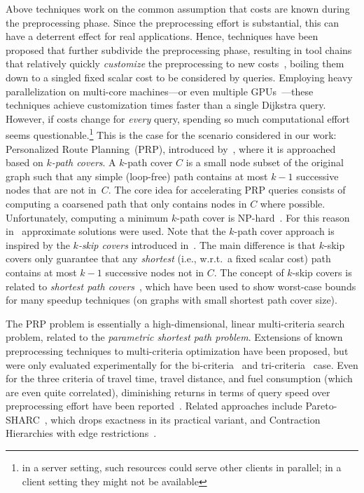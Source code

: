 \documentclass{sig-alternate}
\begin{document}
Above techniques work on the common assumption that costs
are known during the preprocessing phase. Since the preprocessing
effort is substantial, this can have a deterrent effect for real applications. 
Hence, techniques have been proposed that further subdivide the preprocessing phase, resulting in tool chains
that relatively quickly \emph{customize} the preprocessing to new costs~\cite{dgpw-crprn-13,dsw-cch-sea-14}, 
boiling them down to a singled fixed scalar cost to be considered by queries. 
Employing heavy parallelization on multi-core machines---or even multiple GPUs~\cite{dkw-cddgp-14}---these techniques achieve customization times faster than a single Dijkstra query. However, if costs change for \emph{every} query, spending so much computational effort seems questionable.\footnote{in a server setting, such resources could serve other clients in parallel; in a client setting they might not be available}
This is the case
for the scenario considered in our work: Personalized Route
Planning~(PRP), introduced by~\cite{fns-opca-14}, where it is approached based on \emph{$k$-path covers}.
A $k$-path cover $C$ is a small node subset of the original graph such that any simple (loop-free) path contains at most $k-1$ successive nodes that are not in~$C$. 
The core idea for accelerating PRP queries consists of computing a coarsened path that only contains nodes in $C$ where possible. 
Unfortunately, computing a minimum $k$-path cover is NP-hard~\cite{DBLP:journals/dam/BresarKKS11}.
For this reason in~\cite{fns-opca-14} approximate solutions were used.
Note that the $k$-path cover approach is inspired by the \emph{$k$-skip
covers} introduced in~\cite{tsp-osp-11}. The main difference is that
$k$-skip covers only guarantee that any \emph{shortest }(i.e., w.r.t.~a
fixed scalar cost) path contains at most $k-1$ successive nodes not in
$C$. The concept of $k$-skip covers is related to \emph{shortest path covers}~\cite{adfgw-h-13}, which have been used to show worst-case bounds for many speedup techniques (on graphs with small shortest path cover size).



The PRP problem is essentially a high-dimensional, linear multi-criteria search problem, related to the \emph{parametric shortest path problem}. Extensions of known preprocessing techniques to multi-criteria optimization have been proposed, but were only evaluated experimentally for the bi-criteria~\cite{gks-rpfof-10}
and tri-criteria~\cite{fs-pcchm-13} case. Even for the three criteria
of travel time, travel distance, and fuel consumption (which are even
quite correlated), diminishing returns in terms of query speed over preprocessing effort have been reported~\cite{fs-pcchm-13}.
Related approaches include Pareto-SHARC~\cite{dw-pps-09}, which drops exactness in its practical variant, and
Contraction Hierarchies with edge restrictions~\cite{DBLP:journals/jea/GeisbergerRST12}. 
\end{document}
